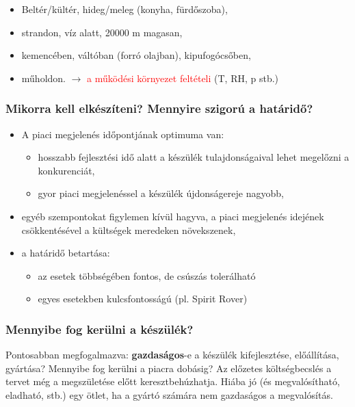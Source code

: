 \documentclass[11pt]{article}
\begin{document}
				\begin{itemize}
					\item Beltér/kültér, hideg/meleg (konyha, fürdőszoba),
					\item strandon, víz alatt, 20000 m magasan, 
					\item kemencében, váltóban (forró olajban), kipufogócsőben,
					\item műholdon.
						\subitem $\rightarrow$ \textcolor{red}{a működési környezet feltételi} (T, RH, p stb.)
				\end{itemize}

			\subsubsection{Mikorra kell elkészíteni? Mennyire szigorú a határidő?}

				\begin{itemize}
					\item A piaci megjelenés időpontjának optimuma van:
					\begin{itemize}
						\item hosszabb fejlesztési idő alatt a készülék tulajdonságaival lehet megelőzni a konkurenciát,
						\item gyor piaci megjelenéssel a készülék újdonságereje nagyobb,
					\end{itemize}
					\item egyéb szempontokat figylemen kívül hagyva, a piaci megjelenés idejének csökkentésével a kültségek meredeken növekszenek,
					\item a határidő betartása:
					\begin{itemize}
						\item az esetek többségében fontos, de csúszás tolerálható
						\item  egyes esetekben kulcsfontosságú (pl. Spirit Rover)
					\end{itemize}
				\end{itemize}

			\subsubsection{Mennyibe fog kerülni a készülék?}

				Pontosabban megfogalmazva: \textbf{gazdaságos}-e a készülék kifejlesztése, előállítása, gyártása? Mennyibe fog kerülni a piacra dobásig? Az előzetes költségbecslés a tervet még a megszületése előtt keresztbehúzhatja. Hiába jó (és megvalósítható, eladható, stb.) egy ötlet, ha a gyártó számára nem gazdaságos a megvalósítás.
\end{document}
